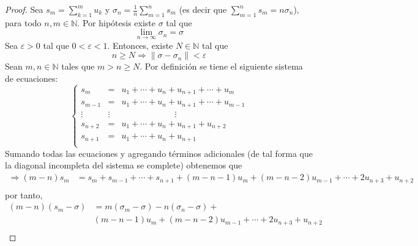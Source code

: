 \documentclass[12pt]{report}
\newcounter{it}
\theoremstyle{largebreak}
\renewcommand{\geq}{\ensuremath{\geqslant}}
\newcommand\norm[1]{\ensuremath{\|#1\|}}
\begin{document}
    \begin{proof}
        Sea $s_m=\sum_{ k=1}^m u_k$ y $\sigma_n=\frac{1}{n}\sum_{ m=1}^n s_m$ (es decir que $\sum_{ m=1}^n s_m=n\sigma_n$), para todo $n,m\in\mathbb{N}$. Por hipótesis existe $\sigma$ tal que
        \begin{equation*}
            \lim_{ n\rightarrow\infty}\sigma_n=\sigma
        \end{equation*}
        Sea $\varepsilon>0$ tal que $0<\varepsilon<1$. Entonces, existe $N\in\mathbb{N}$ tal que
        \begin{equation*}
            n\geq N\Rightarrow\norm{\sigma-\sigma_n}<\varepsilon
        \end{equation*}
        Sean $m,n\in\mathbb{N}$ tales que $m>n\geq N$. Por definición se tiene el siguiente sistema de ecuaciones:
        \begin{equation*}
            \left\{\begin{array}{rcl}
                s_m&=&u_1+\cdots+u_n+u_{ n+1}+\cdots+u_m\\
                s_{ m-1}&=&u_1+\cdots+u_n+u_{ n+1}+\cdots+u_{ m-1}\\
                \vdots\:\:\:\: & \vdots & \quad\quad\quad\quad\quad\quad\: \vdots \\
                s_{ n+2}&=&u_1+\cdots+u_n+u_{ n+1}+u_{ n+2}\\
                s_{ n+1}&=&u_1+\cdots+u_n+u_{ n+1}\\
            \end{array}\right.
        \end{equation*}
        Sumando todas las ecuaciones y agregando términos adicionales (de tal forma que la diagonal incompleta del sistema se complete) obtenemos que
        \begin{equation*}
            \begin{split}
                \Rightarrow (m-n)s_m&=s_m+s_{ m-1}+\cdots+s_{ n+1}+(m-n-1)u_m+(m-n-2)u_{ m-1}+\cdots+2u_{ n+3}+u_{ n+2}\\
            \end{split}
        \end{equation*}
        por tanto,
        \begin{equation*}
            \begin{split}
                (m-n)(s_m-\sigma)&=m(\sigma_m-\sigma)-n(\sigma_n-\sigma)+\\
                &(m-n-1)u_m+(m-n-2)u_{ m-1}+\cdots+2u_{ n+3}+u_{ n+2}\\
            \end{split}

\end{equation*}
\end{proof}
\end{document}

